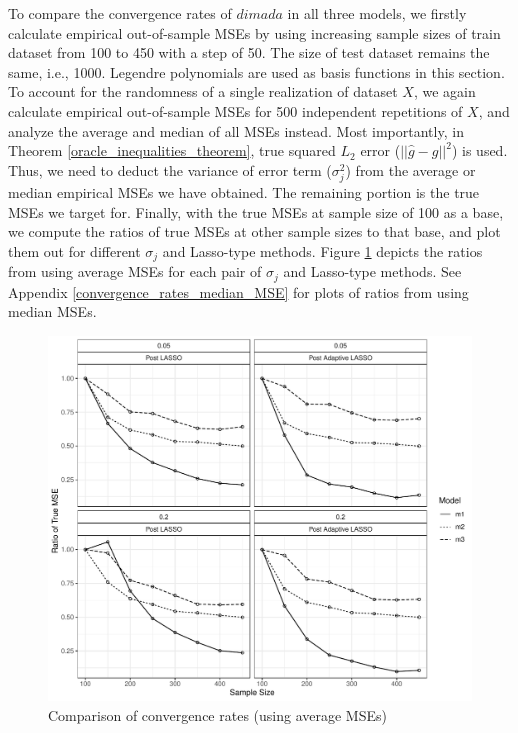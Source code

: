 \documentclass[12pt, a4paper]{article}
\theoremstyle{MAstyle} \newtheorem{assumption}{Assumption}[section]
\theoremstyle{MAstyle} \newtheorem{definition}{Definition}[section]
\theoremstyle{MAstyle} \newtheorem{theorem}{Theorem}[section]
\theoremstyle{MAstyle} \newtheorem{corollary}{Corollary}[section]
\begin{document}
                To compare the convergence rates of $dimada$ in all three models, we firstly calculate empirical out-of-sample MSEs by using increasing sample sizes of train dataset from 100 to 450 with a step of 50. The size of test dataset remains the same, i.e., 1000. Legendre polynomials are used as basis functions in this section. To account for the randomness of a single realization of dataset $X$, we again calculate empirical out-of-sample MSEs for 500 independent repetitions of $X$, and analyze the average and median of all MSEs instead. Most importantly, in Theorem \ref{oracle_inequalities_theorem},  true squared $L_2$ error ($||\widehat{g}-g||^2$) is used. Thus, we need to deduct the variance of error term ($\sigma_j^2$) from the average or median empirical MSEs we have obtained. The remaining portion is the true MSEs we target for. Finally, with the true MSEs at sample size of 100 as a base, we compute the ratios of true MSEs at other sample sizes to that base, and plot them out for different $\sigma_j$ and Lasso-type methods. Figure \ref{rate.mean.plot} depicts the ratios from using average MSEs for each pair of $\sigma_j$ and Lasso-type methods. See Appendix \ref{convergence_rates_median_MSE} for plots of ratios from using median MSEs. 
                \begin{figure}[H]
		          \includegraphics[width = 1\textwidth] {Graphics/rate.mean.plot.pdf}
		          \caption{Comparison of convergence rates (using average MSEs)}
		          \label{rate.mean.plot}
	        \end{figure}
\end{document}
